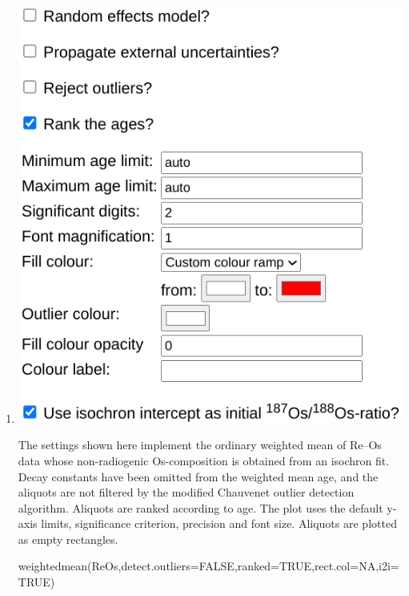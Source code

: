 \begin{refsection}
\begin{enumerate}
\item\noindent\begin{minipage}[t]{.55\linewidth}
\strut\vspace*{-\baselineskip}\newline
\includegraphics[width=\linewidth]{../figures/ReOsWtdMean.png}
\end{minipage}
\begin{minipage}[t]{.45\linewidth}
  The settings shown here implement the ordinary weighted mean of
  Re--Os data whose non-radiogenic Os-composition is obtained from an
  isochron fit. Decay constants have been omitted from the weighted
  mean age, and the aliquots are not filtered by the modified
  Chauvenet outlier detection algorithm. Aliquots are ranked according
  to age. The plot uses the default y-axis limits, significance
  criterion, precision and font size. Aliquots are plotted as empty
  rectangles.
\end{minipage}

\begin{console}
weightedmean(ReOs,detect.outliers=FALSE,ranked=TRUE,rect.col=NA,i2i=TRUE)
\end{console}


\end{enumerate}
\end{refsection}
